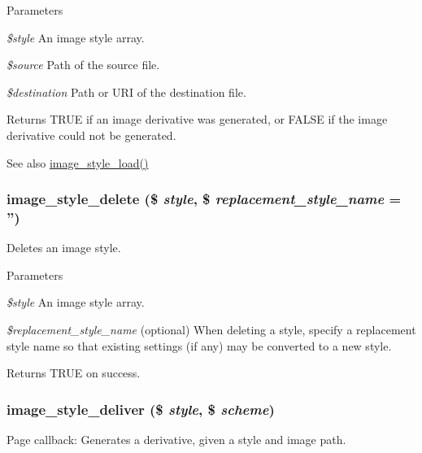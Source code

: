 \begin{DoxyParams}{Parameters}
\item[{\em \$style}]An image style array. \item[{\em \$source}]Path of the source file. \item[{\em \$destination}]Path or URI of the destination file.\end{DoxyParams}
\begin{DoxyReturn}{Returns}
TRUE if an image derivative was generated, or FALSE if the image derivative could not be generated.
\end{DoxyReturn}
\begin{DoxySeeAlso}{See also}
\hyperlink{image_8module_a0d7388bec5f42788968823a8099a64a7}{image\_\-style\_\-load()} 
\end{DoxySeeAlso}
\hypertarget{image_8module_a83cfe6d842e5f7860914cf449f1ba47c}{
\subsubsection[{image\_\-style\_\-delete}]{\setlength{\rightskip}{0pt plus 5cm}image\_\-style\_\-delete (\$ {\em style}, \/  \$ {\em replacement\_\-style\_\-name} = {\ttfamily ''})}}
\label{image_8module_a83cfe6d842e5f7860914cf449f1ba47c}
Deletes an image style.


\begin{DoxyParams}{Parameters}
\item[{\em \$style}]An image style array. \item[{\em \$replacement\_\-style\_\-name}](optional) When deleting a style, specify a replacement style name so that existing settings (if any) may be converted to a new style.\end{DoxyParams}
\begin{DoxyReturn}{Returns}
TRUE on success. 
\end{DoxyReturn}
\hypertarget{image_8module_a80cd974ca58e2f9aaee8a655497d2db7}{
\subsubsection[{image\_\-style\_\-deliver}]{\setlength{\rightskip}{0pt plus 5cm}image\_\-style\_\-deliver (\$ {\em style}, \/  \$ {\em scheme})}}
\label{image_8module_a80cd974ca58e2f9aaee8a655497d2db7}
Page callback: Generates a derivative, given a style and image path.

